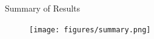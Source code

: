 \documentclass[aspectratio=169]{beamer}
\begin{document}

 

\begin{frame}{Summary of Results}
	\vspace*{-5pt}
	\begin{figure}[htpb]
		\centering
		\texttt{[image: figures/summary.png]}
	\end{figure}
\end{frame}
\end{document}
